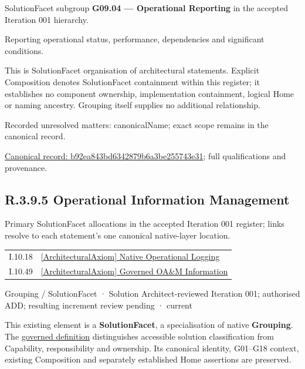 SolutionFacet subgroup \textbf{G09.04 — Operational Reporting} in the accepted Iteration 001 hierarchy.



Reporting operational status, performance, dependencies and significant conditions.



This is SolutionFacet organisation of architectural statements. Explicit Composition denotes SolutionFacet containment within this register; it establishes no component ownership, implementation containment, logical Home or naming ancestry. Grouping itself supplies no additional relationship.


{\small Recorded unresolved matters: canonicalName; exact scope remains in the canonical record.}\par
{\footnotesize \href{../../../../../../../continuum/grouping/b92ea843bd6342879b6a3be255743e31.md}{Canonical record: b92ea843bd6342879b6a3be255743e31}; full qualifications and provenance.}\par
\subsection*{R.3.9.5 Operational Information Management}
\label{navigation:R.3.9.5}

Primary SolutionFacet allocations in the accepted Iteration 001 register; links resolve to each statement’s one canonical native-layer location.\par
\begin{longtable}{p{.22\linewidth}p{.73\linewidth}}
I.10.18 & \hyperref[element:9d094b1b42644ab5aa2071a9460778e2]{[ArchitecturalAxiom] Native Operational Logging} \\
I.10.49 & \hyperref[element:43593f7a9566410ebc1aa30dbe935848]{[ArchitecturalAxiom] Governed OA\&M Information} \\
\end{longtable}
\label{element:da5b4238bd6945cf9b467ff3feb9d76b}
{\small Grouping / SolutionFacet · Solution Architect-reviewed Iteration 001; authorised ADD; resulting increment review pending · current}\par

This existing element is a \textbf{SolutionFacet}, a specialisation of native
\textbf{Grouping}. The \href{\detokenize{../../../../../../../governance/continuum-representation.md#solutionfacet-classification--1119-candidate}}{governed definition}
distinguishes accessible solution classification from Capability, responsibility
and ownership. Its canonical identity, G01–G18 context, existing Composition
and separately established Home assertions are preserved.



